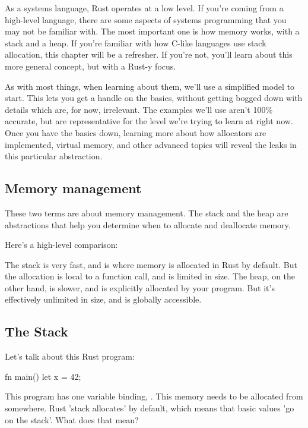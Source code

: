 As a systems language, Rust operates at a low level. If you're coming from a high-level language, there are some aspects of systems
programming that you may not be familiar with. The most important one is how memory works, with a stack and a heap. If you're familiar
with how C-like languages use stack allocation, this chapter will be a refresher. If you're not, you'll learn about this more general
concept, but with a Rust-y focus.

\blank

As with most things, when learning about them, we'll use a simplified model to start. This lets you get a handle on the basics, without
getting bogged down with details which are, for now, irrelevant. The examples we'll use aren't 100\% accurate, but are representative for
the level we're trying to learn at right now. Once you have the basics down, learning more about how allocators are implemented, virtual
memory, and other advanced topics will reveal the leaks in this particular abstraction.

\subsection*{Memory management}

These two terms are about memory management. The stack and the heap are abstractions that help you determine when to allocate and
deallocate memory.

\blank

Here's a high-level comparison:

\blank

The stack is very fast, and is where memory is allocated in Rust by default. But the allocation is local to a function call, and
is limited in size. The heap, on the other hand, is slower, and is explicitly allocated by your program. But it's effectively
unlimited in size, and is globally accessible.

\subsection*{The Stack}

Let's talk about this Rust program:

\begin{rustc}
fn main() {
    let x = 42;
}
\end{rustc}

This program has one variable binding, \x. This memory needs to be allocated from somewhere. Rust 'stack allocates' by default, which means that basic values 'go on the stack'. What does that mean?

